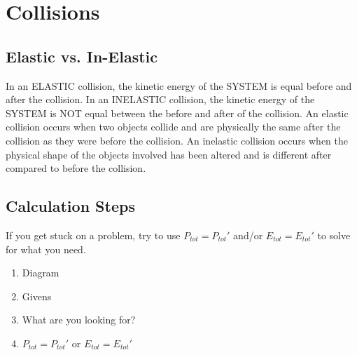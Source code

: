 \documentclass{article}
\begin{document}
\section{Collisions}
\begin{adjustwidth}{1cm}{0pt}
    \subsection*{Elastic vs. In-Elastic}
    \begin{adjustwidth}{0.5cm}{0pt}
        In an ELASTIC collision, the kinetic energy of the SYSTEM is equal before and after the collision.  In an INELASTIC collision, the kinetic energy of the SYSTEM is NOT equal between the before and after of the collision.\newline\newline
        An elastic collision occurs when two objects collide and are physically the same after the collision as they were before the collision. An inelastic collision occurs when the physical shape of the objects involved has been altered and is different after compared to before the collision.
    \end{adjustwidth}
    \subsection*{Calculation Steps}
    \begin{flushleft}
        If you get stuck on a problem, try to use $P_{tot} = P_{tot}\prime$ and/or $E_{tot} = E_{tot}\prime$ to solve for what you need.
    \end{flushleft}
    \vspace*{5pt}
    \begin{adjustwidth}{0.5cm}{0pt}
        \begin{enumerate}
            \item Diagram
            \item Givens
            \item What are you looking for?
            \item $P_{tot} = P_{tot}\prime$ or $E_{tot} = E_{tot}\prime$
        \end{enumerate}
    \end{adjustwidth}
\end{adjustwidth}
\end{document}
